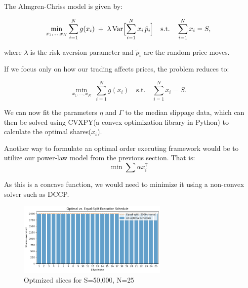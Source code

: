 \documentclass[12pt, letterpaper]{article}
\begin{document}
The Almgren-Chriss model is given by:

\[
  \min_{x_1,\dots,x_N}
    \sum_{i=1}^N g(x_i)
    \;+\;\lambda\,\mathrm{Var}\Bigl[\sum_{i=1}^N x_i\,\tilde p_i\Bigr]
  \quad\text{s.t.}\quad
    \sum_{i=1}^N x_i = S,
\]

where \(\lambda\) is the risk‐aversion parameter and \(\tilde p_i\) are the random price moves.

If we focus only on how our trading affects prices, the problem reduces to:

\[
  \min_{x_1,\ldots,x_N}\;
    \sum_{i=1}^N g(x_i)
  \quad\text{s.t.}\quad
    \sum_{i=1}^N x_i = S.
\]


We can now fit the parameters $\eta$ and $\Gamma$ to the median slippage data, which can then be solved using CVXPY(a convex optimization library in Python) to calculate the optimal shares($x_i$).


\vspace{1em}

Another way to formulate an optimal order executing framework would be to utilize our power-law model from the previous section. That is:
\[\min \sum \alpha x_i^\gamma\]


As this is a concave function, we would need to minimize it using a non-convex solver such as DCCP.




\begin{figure}[h!] %
    \centering
    \includegraphics[width=0.65\textwidth]{res/images/optimized_slices_test.png} %
    \caption{Optmized slices for S=50,000, N=25}
    \label{fig:optimized_strategy} 
\end{figure}
\end{document}
